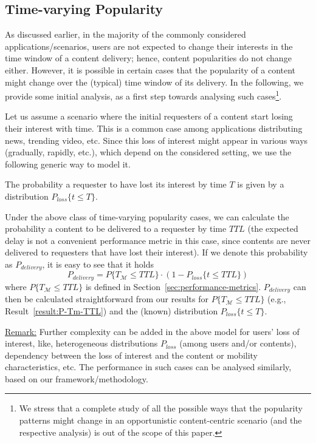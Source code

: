 \documentclass[journal]{IEEEtran}
\newcommand{\revisionRed}[1]{{#1}}\newcommand{\red}[1]{{#1}}
\begin{document}
\subsection*{\revisionRed{\textbf{Time-varying Popularity}}}
\revisionRed{As discussed earlier, in the majority of the commonly considered applications/scenarios, users are not expected to change their interests in the time window of a content delivery; hence, content popularities do not change either. However, it is possible in certain cases that the popularity of a content might change over the (typical) time window of its delivery. In the following, we provide some initial analysis, as a first step towards analysing such cases\footnote{\revisionRed{We stress that a complete study of all the possible ways that the popularity patterns might change in an opportunistic content-centric scenario (and the respective analysis) is out of the scope of this paper.}}.}

\revisionRed{Let us assume a scenario where the initial requesters of a content start losing their interest with time. This is a common case among applications distributing news, trending video, etc. Since this loss of interest might appear in various ways (gradually, rapidly, etc.), which depend on the considered setting, we use the following generic way to model it.
\begin{definition}[Time-varying Popularity]
The probability a requester to have lost its interest by time $T$ is given by a distribution $P_{loss}\{t\leq T\}$.
\end{definition}
Under the above class of time-varying popularity cases, we can calculate the probability a content to be delivered to a requester by time $TTL$ (the expected delay is not a convenient performance metric in this case, since contents are never delivered to requesters that have lost their interest). If we denote this probability as $P_{delivery}$, it is easy to see that it holds
\begin{equation}
P_{delivery} = P\{T_{\mathcal{M}}\leq TTL \}\cdot \left(1-P_{loss}\{t\leq TTL\}\right)
\end{equation}
where $P\{T_{\mathcal{M}}\leq TTL \}$ is defined in Section~\ref{sec:performance-metrics}. $P_{delivery}$ can then be calculated straightforward from our results for $P\{T_{\mathcal{M}}\leq TTL \}$ (e.g., Result~\ref{result:P-Tm-TTL}) and the (known) distribution $P_{loss}\{t\leq T\}$.}

\revisionRed{\underline{Remark:} Further complexity can be added in the above model for users' loss of interest, like, heterogeneous distributions $P_{loss}$ (among users and/or contents), dependency between the loss of interest and the content or mobility characteristics, etc. The performance in such cases can be analysed similarly, based on our framework/methodology. }
\end{document}
